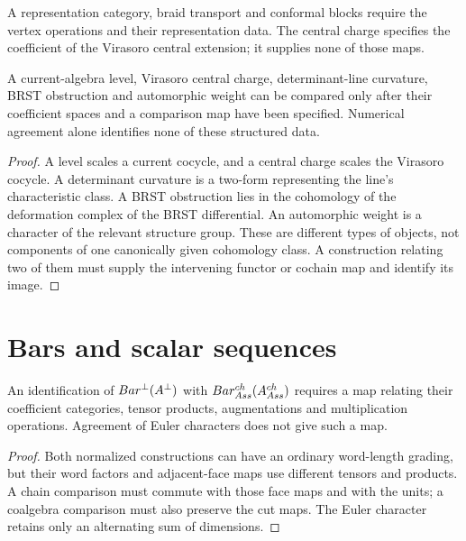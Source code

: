 A representation category, braid transport and conformal blocks require the
vertex operations and their representation data. The central charge specifies
the coefficient of the Virasoro central extension; it supplies none of those maps.

\begin{proposition}
\label{nogo:anomalies-spine}
A current-algebra level, Virasoro central charge, determinant-line curvature,
BRST obstruction and automorphic weight can be compared only after their
coefficient spaces and a comparison map have been specified.
Numerical agreement alone identifies none of these structured data.
\end{proposition}
\begin{proof}
A level scales a current cocycle, and a central charge scales the Virasoro cocycle.
A determinant curvature is a two-form representing the line's characteristic class.
A BRST obstruction lies in the cohomology of the deformation complex of the
BRST differential. An automorphic weight is a character of the relevant
structure group. These are different types of objects, not components of one
canonically given cohomology class. A construction relating two of them must
supply the intervening functor or cochain map and identify its image.
\end{proof}

\section{Bars and scalar sequences}
\begin{proposition}
An identification of $Bar^{\perp}(A^\perp)$ with
$Bar^{ch}_{Ass}(A^{ch}_{Ass})$ requires a map relating their coefficient
categories, tensor products, augmentations and multiplication operations.
Agreement of Euler characters does not give such a map.
\end{proposition}
\begin{proof}
Both normalized constructions can have an ordinary word-length grading,
but their word factors and adjacent-face maps use different tensors and products.
A chain comparison must commute with those face maps and with the units;
a coalgebra comparison must also preserve the cut maps.
The Euler character retains only an alternating sum of dimensions.
\end{proof}

